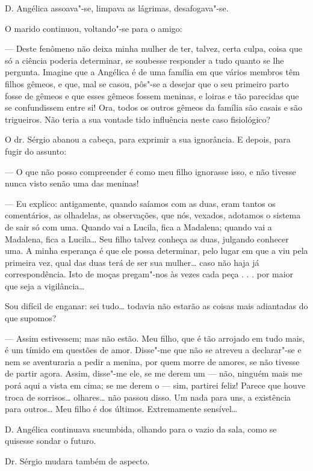 D. Angélica assoava"-se, limpava as lágrimas, desafogava"-se.

O marido continuou, voltando"-se para o amigo:

--- Deste fenômeno não deixa minha mulher de ter, talvez, certa culpa,
coisa que só a ciência poderia determinar, se soubesse responder a tudo
quanto se lhe pergunta. Imagine que a Angélica é de uma família em que
vários membros têm filhos gêmeos, e que, mal se casou, pôs"-se a desejar
que o seu primeiro parto fosse de gêmeos e que esses gêmeos fossem
meninas, e loiras e tão parecidas que se confundissem entre si! Ora,
todos os outros gêmeos da família são casais e são trigueiros. Não teria
a sua vontade tido influência neste caso fisiológico?

O dr. Sérgio abanou a cabeça, para exprimir a sua ignorância. E depois,
para fugir do assunto:

--- O que não posso compreender é como meu filho ignorasse isso, e não
tivesse nunca visto senão uma das meninas!

--- Eu explico: antigamente, quando saíamos com as duas, eram tantos os
comentários, as olhadelas, as observações, que nós, vexados, adotamos o
sistema de sair só com uma. Quando vai a Lucila, fica a Madalena; quando
vai a Madalena, fica a Lucila\ldots{} Seu filho talvez conheça as duas,
julgando conhecer uma. A minha esperança é que ele possa determinar,
pelo lugar em que a viu pela primeira vez, qual das duas terá de ser sua
mulher\ldots{} caso não haja já correspondência. Isto de moças pregam"-nos às
vezes cada peça . . . por maior que seja a vigilância\ldots{}

Sou difícil de enganar: sei tudo\ldots{} todavia não estarão as coisas mais
adiantadas do que supomos?

--- Assim estivessem; mas não estão. Meu filho, que é tão arrojado em
tudo mais, é um tímido em questões de amor. Disse"-me que não se atreveu
a declarar"-se e nem se aventuraria a pedir a menina, por quem morre de
amores, se não tivesse de partir agora. Assim, disse"-me ele, se me derem
um --- não, ninguém mais me porá aqui a vista em cima; se me derem o ---
sim, partirei feliz! Parece que houve troca de sorrisos\ldots{} olhares\ldots{}
não passou disso. Um nada para uns, a existência para outros\ldots{} Meu
filho é dos últimos. Extremamente sensível\ldots{}

D. Angélica continuava sucumbida, olhando para o vazio da sala, como se
quisesse sondar o futuro.

Dr. Sérgio mudara também de aspecto.


